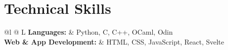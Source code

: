 \documentclass[a4paper,10pt]{article}
\makeatletter
\newcommand{\resumeSubheading}[4]{
\vspace{1.2mm}
    \begin{tabular*}{1.0\textwidth}[t]{l@{\extracolsep{\fill}}r}
        \textbf{#1} & \textit{\small{#4}} \\
        \textit{\small{#3}} &  \small{#2}\\
    \end{tabular*}\\[-1.5mm]
}
\newcommand{\resumeItemListStart}{\vspace{-1mm}\begin{justify}\begin{itemize}[leftmargin=3ex, rightmargin=2ex, noitemsep,labelsep=1.2mm,itemsep=0.4mm]\small}
\newcommand{\resumeSubHeadingListEnd}{\vspace{0.5mm}}
\newcommand{\resumeItemListEnd}{\end{itemize}\end{justify}\vspace{-1.2mm}}
\makeatother
\begin{document}



\resumeSubHeadingListEnd

\section{\textbf{Technical Skills}}
\vspace{1mm}
\begin{tabularx}{\textwidth}{@{}l @{\hspace{4mm}} L}
    \textbf{Languages:} & Python, C, C++, OCaml, Odin \\
    \textbf{Web \& App Development:} & HTML, CSS, JavaScript, React, Svelte
\end{tabularx}
\end{document}
